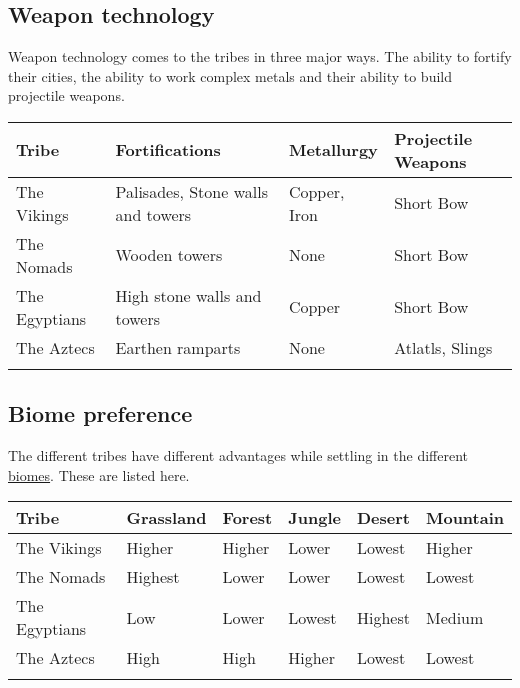 \begin{landscape}
	\newpage

	\subsection{Weapon technology}
	Weapon technology comes to the tribes in three major ways. The ability to
	fortify their cities, the ability to work complex metals and their ability to
	build projectile weapons.

	\begin{longtable}{p{5cm}p{5cm}p{4cm}p{6cm}}
		\toprule{}
		Tribe
		 & Fortifications
		 & Metallurgy
		 & Projectile Weapons                \\
		\midrule{}
		The \gls{Vikings}
		 & Palisades, Stone walls and towers
		 & Copper, Iron
		 & Short Bow                         \\
		The \gls{Nomads}
		 & Wooden towers
		 & None
		 & Short Bow                         \\
		The \gls{Egyptians}
		 & High stone walls and towers
		 & Copper
		 & Short Bow                         \\
		The \gls{Aztecs}
		 & Earthen ramparts
		 & None
		 & Atlatls, Slings                   \\
		\bottomrule{}
	\end{longtable}

	\subsection{Biome preference}
	The different tribes have different advantages while settling in the different
	\hyperref[ch:World:Biomes]{biomes}. These are listed here.

	\begin{longtable}{llllll}
		\toprule{}
		Tribe
		 & \Gls*{Grassland}
		 & \Gls*{Forest}
		 & \Gls*{Jungle}
		 & \Gls*{Desert}
		 & \Gls*{Mountain}  \\
		\midrule{}
		The \gls{Vikings}
		 & Higher
		 & Higher
		 & Lower
		 & Lowest
		 & Higher           \\
		The \gls{Nomads}
		 & Highest
		 & Lower
		 & Lower
		 & Lowest
		 & Lowest           \\
		The \gls{Egyptians}
		 & Low
		 & Lower
		 & Lowest
		 & Highest
		 & Medium           \\
		The \gls{Aztecs}
		 & High
		 & High
		 & Higher
		 & Lowest
		 & Lowest           \\
		\bottomrule{}
	\end{longtable}

\end{landscape}
